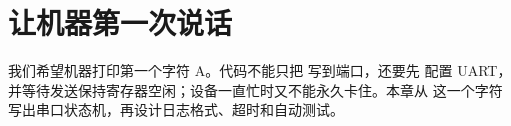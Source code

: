 \chapter{让机器第一次说话}

我们希望机器打印第一个字符 A。代码不能只把  写到端口，还要先
配置 UART，并等待发送保持寄存器空闲；设备一直忙时又不能永久卡住。本章从
这一个字符写出串口状态机，再设计日志格式、超时和自动测试。







